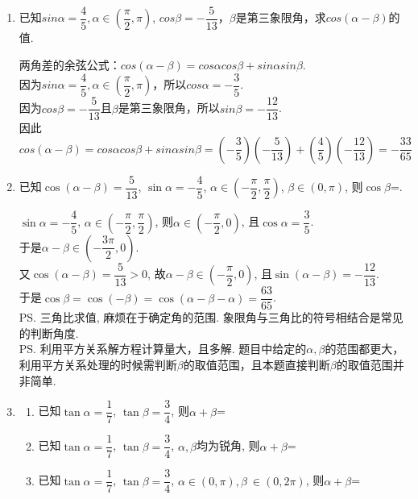 \begin{enumerate}
    
    \item 已知$sin\alpha = \dfrac{4}{5}, \alpha \in \left(\dfrac{\pi}{2}, \pi\right)$, $cos\beta = -\dfrac{5}{13}$，$\beta$是第三象限角，求$cos(\alpha - \beta)$的值.
    \begin{jieda}
        两角差的余弦公式：$cos(\alpha - \beta) = cos\alpha cos\beta + sin\alpha sin\beta$. \\
        因为$sin\alpha = \dfrac{4}{5}, \alpha \in \left(\dfrac{\pi}{2}, \pi\right)$，所以$cos\alpha = -\dfrac{3}{5}$.\\
        因为$cos\beta = -\dfrac{5}{13}$且$\beta$是第三象限角，所以$sin\beta = -\dfrac{12}{13}$.\\
        因此$cos(\alpha - \beta) = cos\alpha cos\beta + sin\alpha sin\beta = \left(-\dfrac{3}{5}\right)\left(-\dfrac{5}{13}\right)+\left(\dfrac{4}{5}\right)\left(-\dfrac{12}{13}\right) = -\dfrac{33}{65}$
    \end{jieda}

    \item 已知$\cos\left(\alpha-\beta\right)=\dfrac{5}{13}$, $\sin\alpha=-\dfrac{4}{5}$, $\alpha\in\left(-\dfrac{\pi}{2},\dfrac{\pi}{2}\right)$, 
    $\beta\in\left(0,\pi\right)$, 则$\cos\beta$=. 
    \begin{jieda}
    $\sin\alpha=-\dfrac{4}{5}$, $\alpha\in\left(-\dfrac{\pi}{2},\dfrac{\pi}{2}\right)$, 则$\alpha\in\left(-\dfrac{\pi}{2},0\right)$, 且$\cos\alpha=\dfrac{3}{5}$. \\
    于是$\alpha-\beta\in\left(-\dfrac{3\pi}{2},0\right)$. \\
    又$\cos\left(\alpha-\beta\right)=\dfrac{5}{13}>0$, 故$\alpha-\beta\in\left(-\dfrac{\pi}{2},0\right)$, 且$\sin\left(\alpha-\beta\right)=-\dfrac{12}{13}$. \\
    于是$\cos\beta=\cos\left(-\beta\right)=\cos\left(\alpha-\beta-\alpha\right)=\dfrac{63}{65}$. \\
    \ps 三角比求值, 麻烦在于确定角的范围. 象限角与三角比的符号相结合是常见的判断角度. \\
    \ps 利用平方关系解方程计算量大，且多解. 题目中给定的$\alpha, \beta$的范围都更大，利用平方关系处理的时候需判断$\beta$的取值范围，且本题直接判断$\beta$的取值范围并非简单.
    \end{jieda}
    
    \item 
    \begin{enumerate}
        \item 已知$\tan\alpha=\dfrac{1}{7}$, $\tan\beta=\dfrac{3}{4}$, 则$\alpha+\beta$=
        \item 已知$\tan\alpha=\dfrac{1}{7}$, $\tan\beta=\dfrac{3}{4}$, $\alpha,\beta$均为锐角, 则$\alpha+\beta$=
        \item 已知$\tan\alpha=\dfrac{1}{7}$, $\tan\beta=\dfrac{3}{4}$, $\alpha \in (0, \pi), \beta\ \in (0, 2\pi)$, 则$\alpha+\beta$=
    \end{enumerate}
    

\end{enumerate}
